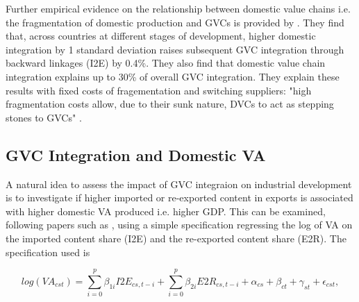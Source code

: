 \documentclass[a4paper]{article}
\begin{document}



Further empirical evidence on the relationship between domestic value chains i.e. the fragmentation of domestic production and GVCs is provided by \citet{beverelli2019domestic}. They find that, across countries at different stages of development, higher domestic integration by 1 standard deviation raises subsequent GVC integration through backward linkages (I2E) by 0.4\%. They also find that domestic value chain integration explains up to 30\% of overall GVC integration. They explain these results with fixed costs of fragementation and switching suppliers: "high fragmentation costs allow, due to their sunk nature, DVCs to act as stepping stones to GVCs" \citep{beverelli2019domestic}. %

\subsection{GVC Integration and Domestic VA}

A natural idea to assess the impact of GVC integraion on industrial development is to investigate if higher imported or re-exported content in exports is associated with higher domestic VA produced i.e. higher GDP. This can be examined, following papers such as \citet{kummritz2015global}, using a simple specification regressing the log of VA on the imported content share (I2E) and the re-exported content share (E2R). The specification used is

\begin{equation} \label{eq:GROWTH_HDFE}
log(VA_{cst}) = \sum_{i=0}^p \beta_{1i} I2E_{cs,t-i} + \sum_{i = 0}^p \beta_{2i} E2R_{cs,t-i}  + \alpha_{cs} + \beta_{ct} +\gamma_{st} + \epsilon_{cst},
\end{equation}
\end{document}
